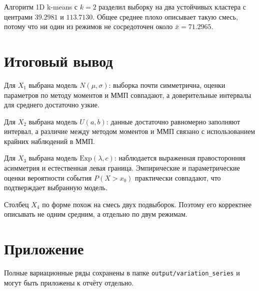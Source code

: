 \documentclass[12pt,a4paper]{article}
\begin{document}
Алгоритм 1D k-means с $k = 2$ разделил выборку на два устойчивых кластера с центрами $39.2981$ и $113.7130$. Общее среднее плохо описывает такую смесь, потому что ни один из режимов не сосредоточен около $\bar{x} = 71.2965$.

\section{Итоговый вывод}

Для $X_1$ выбрана модель $N(\mu,\sigma)$: выборка почти симметрична, оценки параметров по методу моментов и ММП совпадают, а доверительные интервалы для среднего достаточно узкие.

Для $X_2$ выбрана модель $U(a,b)$: данные достаточно равномерно заполняют интервал, а различие между методом моментов и ММП связано с использованием крайних наблюдений в ММП.

Для $X_3$ выбрана модель $\mathrm{Exp}(\lambda,c)$: наблюдается выраженная правосторонняя асимметрия и естественная левая граница. Эмпирические и параметрические оценки вероятности события $P(X > x_0)$ практически совпадают, что подтверждает выбранную модель.

Столбец $X_4$ по форме похож на смесь двух подвыборок. Поэтому его корректнее описывать не одним средним, а отдельно по двум режимам.

\section{Приложение}

Полные вариационные ряды сохранены в папке \texttt{output/variation\_series} и могут быть приложены к отчёту отдельно.
\end{document}
